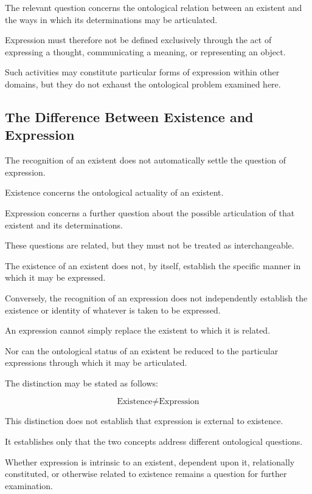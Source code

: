 The relevant question concerns the ontological
relation between an existent and the ways
in which its determinations may be articulated.

Expression must therefore not be defined
exclusively through the act of expressing
a thought, communicating a meaning,
or representing an object.

Such activities may constitute particular
forms of expression within other domains,
but they do not exhaust the ontological
problem examined here.

\subsection{The Difference Between Existence and Expression}

The recognition of an existent does not
automatically settle the question of expression.

Existence concerns the ontological actuality
of an existent.

Expression concerns a further question
about the possible articulation of that
existent and its determinations.

These questions are related, but they
must not be treated as interchangeable.

The existence of an existent does not,
by itself, establish the specific manner
in which it may be expressed.

Conversely, the recognition of an expression
does not independently establish the
existence or identity of whatever is
taken to be expressed.

An expression cannot simply replace
the existent to which it is related.

Nor can the ontological status of an existent
be reduced to the particular expressions
through which it may be articulated.

The distinction may be stated as follows:

\[
\text{Existence}
\neq
\text{Expression}
\]

This distinction does not establish
that expression is external to existence.

It establishes only that the two concepts
address different ontological questions.

Whether expression is intrinsic to an existent,
dependent upon it, relationally constituted,
or otherwise related to existence remains
a question for further examination.

